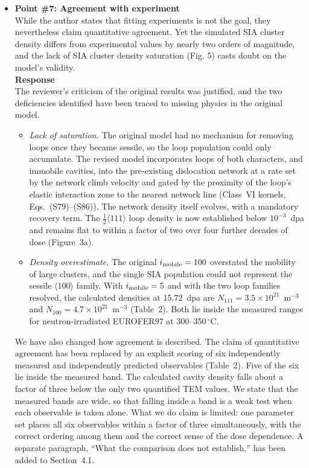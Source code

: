 \documentclass{article}
\newcommand{\hkl}[1]{\langle #1\rangle}
\newcommand{\half}{\tfrac{1}{2}}
\newcommand{\imob}{i_{\rm mobile}}
\begin{document}
\begin{itemize}
\item \textbf{Point \#7: Agreement with experiment}\\
While the author states that fitting experiments is not the goal, they nevertheless claim quantitative agreement. Yet the simulated SIA cluster density differs from experimental values by nearly two orders of magnitude, and the lack of SIA cluster density saturation (Fig. 5) casts doubt on the model's validity.\\

\textbf{Response}\\
The reviewer's criticism of the original results was justified, and the two deficiencies identified have been traced to missing physics in the original model.
\begin{itemize}
    \item \emph{Lack of saturation.} The original model had no mechanism for removing loops once they became sessile, so the loop population could only accumulate. The revised model incorporates loops of both characters, and immobile cavities, into the pre-existing dislocation network at a rate set by the network climb velocity and gated by the proximity of the loop's elastic interaction zone to the nearest network line (Class~VI kernels, Eqs.~(S79)--(S86)). The network density itself evolves, with a mandatory recovery term. The $\half\hkl{111}$ loop density is now established below $10^{-3}$~dpa and remains flat to within a factor of two over four further decades of dose (Figure~3a).
    \item \emph{Density overestimate.} The original $\imob=100$ overstated the mobility of large clusters, and the single SIA population could not represent the sessile $\hkl{100}$ family. With $\imob=5$ and with the two loop families resolved, the calculated densities at 15.72~dpa are $N_{111}=3.5\times10^{21}$~m$^{-3}$ and $N_{100}=4.7\times10^{21}$~m$^{-3}$ (Table~2). Both lie inside the measured ranges for neutron-irradiated EUROFER97 at 300--350\,$^\circ$C.
\end{itemize}

We have also changed how agreement is described. The claim of quantitative agreement has been replaced by an explicit scoring of six independently measured and independently predicted observables (Table~2). Five of the six lie inside the measured band. The calculated cavity density falls about a factor of three below the only two quantified TEM values. We state that the measured bands are wide, so that falling inside a band is a weak test when each observable is taken alone. What we do claim is limited: one parameter set places all six observables within a factor of three simultaneously, with the correct ordering among them and the correct sense of the dose dependence. A separate paragraph, ``What the comparison does not establish,'' has been added to Section~4.1.


\end{itemize}
\end{document}
